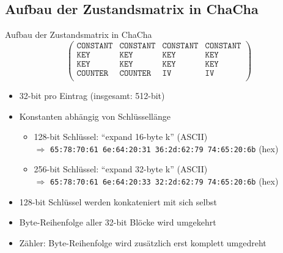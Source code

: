 \documentclass{beamer}
\begin{document}
\subsection{Aufbau der Zustandsmatrix in ChaCha}
\begin{frame}{Aufbau der Zustandsmatrix in ChaCha}
\begin{equation*}
\begin{pmatrix}
\texttt{CONSTANT}& \texttt{CONSTANT} & \texttt{CONSTANT} & \texttt{CONSTANT} \\
\texttt{KEY} & \texttt{KEY} & \texttt{KEY} & \texttt{KEY} \\
\texttt{KEY} & \texttt{KEY} & \texttt{KEY} & \texttt{KEY} \\
\texttt{COUNTER} & \texttt{COUNTER} & \texttt{IV} & \texttt{IV} \\
\end{pmatrix}
\end{equation*}
\begin{itemize}
\item 32-bit pro Eintrag (insgesamt: 512-bit)
\item Konstanten abhängig von Schlüssellänge
\begin{itemize}
\item 128-bit Schlüssel: ``expand 16-byte k'' (ASCII) \\
$\Rightarrow$ \texttt{65:78:70:61 6e:64:20:31 36:2d:62:79 74:65:20:6b} (hex)
\item 256-bit Schlüssel: ``expand 32-byte k'' (ASCII) \\
$\Rightarrow$ \texttt{65:78:70:61 6e:64:20:33 32:2d:62:79 74:65:20:6b} (hex)
\end{itemize}
\item 128-bit Schlüssel werden konkateniert mit sich selbst
\item Byte-Reihenfolge aller 32-bit Blöcke wird umgekehrt
\item Zähler: Byte-Reihenfolge wird zusätzlich erst komplett umgedreht
\end{itemize}
\end{frame}
\end{document}

